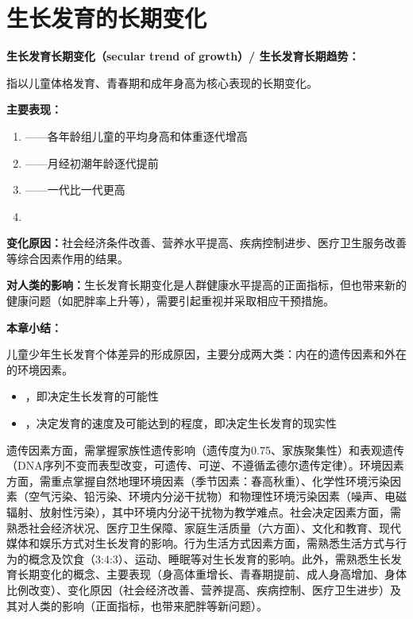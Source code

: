 \section{生长发育的长期变化}

\begin{defbox}
\textbf{生长发育长期变化（secular trend of growth）/ 生长发育长期趋势：}

指以儿童体格发育、青春期和成年身高为核心表现的长期变化。

\textbf{主要表现：}
\begin{enumerate}[leftmargin=*]
    \item {}——各年龄组儿童的平均身高和体重逐代增高
    \item {}——月经初潮年龄逐代提前
    \item {}——一代比一代更高
    \item {}
\end{enumerate}

\textbf{变化原因：}社会经济条件改善、营养水平提高、疾病控制进步、医疗卫生服务改善等综合因素作用的结果。

\textbf{对人类的影响：}生长发育长期变化是人群健康水平提高的正面指标，但也带来新的健康问题（如肥胖率上升等），需要引起重视并采取相应干预措施。
\end{defbox}

\begin{keybox}
\textbf{本章小结：}

儿童少年生长发育个体差异的形成原因，主要分成两大类：内在的遗传因素和外在的环境因素。
\begin{itemize}[leftmargin=*]
    \item {}，即决定生长发育的可能性
    \item {}，决定发育的速度及可能达到的程度，即决定生长发育的现实性
\end{itemize}

遗传因素方面，需掌握家族性遗传影响（遗传度为0.75、家族聚集性）和表观遗传（DNA序列不变而表型改变，可遗传、可逆、不遵循孟德尔遗传定律）。环境因素方面，需重点掌握自然地理环境因素（季节因素：春高秋重）、化学性环境污染因素（空气污染、铅污染、环境内分泌干扰物）和物理性环境污染因素（噪声、电磁辐射、放射性污染），其中环境内分泌干扰物为教学难点。社会决定因素方面，需熟悉社会经济状况、医疗卫生保障、家庭生活质量（六方面）、文化和教育、现代媒体和娱乐方式对生长发育的影响。行为生活方式因素方面，需熟悉生活方式与行为的概念及饮食（3:4:3）、运动、睡眠等对生长发育的影响。此外，需熟悉生长发育长期变化的概念、主要表现（身高体重增长、青春期提前、成人身高增加、身体比例改变）、变化原因（社会经济改善、营养提高、疾病控制、医疗卫生进步）及其对人类的影响（正面指标，也带来肥胖等新问题）。
\end{keybox}

\newpage
